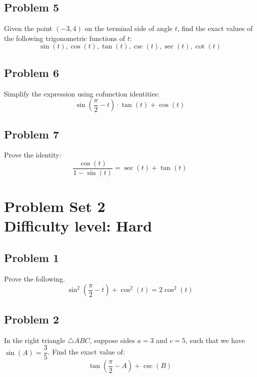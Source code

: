 \documentclass[12pt]{article}
\begin{document}
\subsection*{Problem 5}
Given the point \((-3, 4)\) on the terminal side of angle \(t\), find the exact values of the following trigonometric functions of \(t\):
\[\sin(t),\cos(t),\tan(t),\csc(t),\sec(t),\cot(t)\]

\subsection*{Problem 6}
Simplify the expression using cofunction identities:
\[
\sin\left(\dfrac{\pi}{2} - t\right) \cdot \tan(t) + \cos(t)
\]


\subsection*{Problem 7}
Prove the identity:
\[
\dfrac{\cos(t)}{1 - \sin(t)} = \sec(t) + \tan(t)
\]

\section*{Problem Set 2\\Difficulty level: Hard}
\subsection*{Problem 1}
Prove the following.
\[
\sin^2\left(\dfrac{\pi}{2} - t\right) + \cos^2(t) = 2\cos^2(t)
\]

\subsection*{Problem 2}
In the right triangle \(\triangle ABC\), suppose sides \(a=3\) and \(c=5\), such that we have \(\sin(A) = \dfrac{3}{5}\). Find the exact value of:
\[
\tan\left(\dfrac{\pi}{2} - A\right) + \csc(B)
\]
\begin{center}
\end{center}
\end{document}
